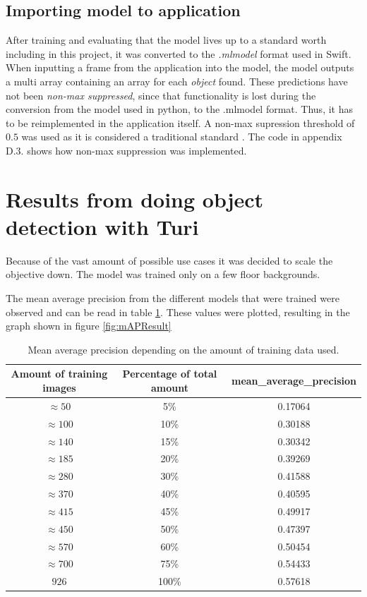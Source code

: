 \subsection{Importing model to application}
After training and evaluating that the model lives up to a standard worth including in this
 project, it was converted to the \textit{.mlmodel} format used in Swift. When inputting a frame from the
application into the model, the model outputs a multi array containing an array for each
  \textit{object} found. These predictions have not been \textit{non-max suppressed}, since that functionality is lost during the conversion from the model used in python, to the .mlmodel format. Thus, it has to be reimplemented in the application itself. 
  A non-max supression threshold of $0.5$ was used as it is considered a traditional standard \cite{nms}. The code in appendix D.3. shows how non-max suppression was implemented. 


\section{Results from doing object detection with Turi}
\label{sec:turiResults}
Because of the vast amount of possible use cases it was decided to scale the objective down. The model was trained only on a few floor backgrounds. 

The mean average precision from the different models that were trained were observed and can be read in table \ref{table:mAP}. These values were plotted, resulting in the graph shown in figure \ref{fig:mAPResult}


\begin{table}[h]
\centering
\begin{tabular}{ |c|c|c| } 
 \hline
 Amount of training images & Percentage of total amount & mean\_average\_precision  \\ 
 \hline
 $\approx 50$& 5\% & 0.17064 \\
 \hline
 $\approx 100$& 10\% & 0.30188 \\
\hline
  $\approx 140$& 15\% &  0.30342 \\
 \hline
 $\approx 185$& 20\% & 0.39269 \\
 \hline
$\approx 280$ &  30\% & 0.41588 \\
 \hline
 $\approx 370$& 40\% & 0.40595 \\
 \hline
 $\approx 415$& 45\% & 0.49917 \\
 \hline
 $\approx 450$& 50\% & 0.47397 \\
\hline
$\approx 570$ & 60\% & 0.50454 \\
\hline
 $\approx 700$& 75\% & 0.54433 \\
 \hline
$926$ & 100\% & 0.57618 \\
 \hline
\end{tabular}
\caption{Mean average precision depending on the amount of training data used.}
\label{table:mAP}
\end{table}

